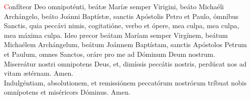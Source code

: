 \textcolor{red}{C}onfíteor Deo omnipoténti, beát{\ae} Marí{\ae} semper Virigini, beáto Michaéli Archángelo, beáto Joánni Baptíst{\ae}, sanctis 
Apóstolis Petro et Paulo, ómníbus Sanctis, quia peccávi nimis, cogitatióne, verbo et ópere, mea culpa, mea culpa, mea máxima culpa. Ideo precor beátam
Maríam semper Virgínem, beátum Michaélem Archángelum, beátum Joánnem Baptístam, sanctis Apóstolos Petrum et Paulum, omnes Sanctos,
oráre pro me ad Dóminum Deum nostrum.\\[2mm]
Misereátur nostri omnipotens Deus, et, dimíssis peccátis nostris, perdúcat nos ad vitam {\ae}térnam. Amen.\\[2mm]
Indulgéntiam, absolutionem, et remissiónem peccatórum nostrórum tríbuat nobis omnípotens et miséricors Dóminus. Amen.